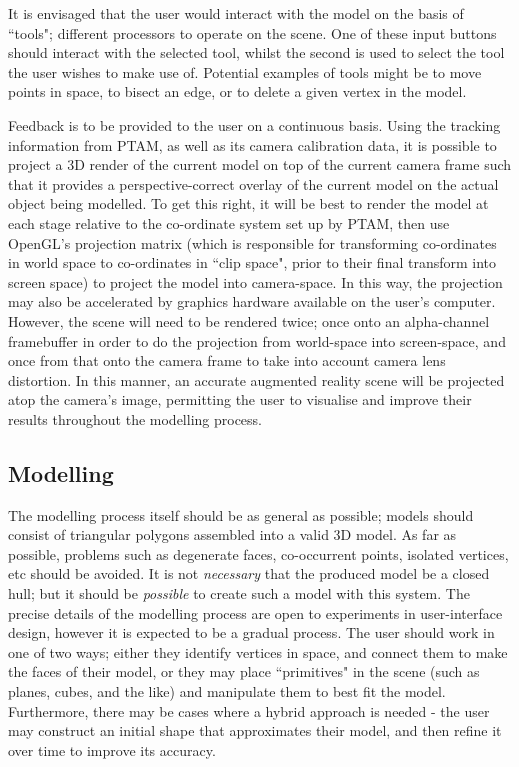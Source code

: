 \documentclass[a4paper,10pt]{article}
\begin{document}
It is envisaged that the user would interact with the model on the basis of ``tools"; different processors to operate on the scene. One of these input buttons should interact with the selected tool, whilst the second is used to select the tool the user wishes to make use of. Potential examples of tools might be to move points in space, to bisect an edge, or to delete a given vertex in the model.

Feedback is to be provided to the user on a continuous basis. Using the tracking information from PTAM, as well as its camera calibration data, it is possible to project a 3D render of the current model on top of the current camera frame such that it provides a perspective-correct overlay of the current model on the actual object being modelled. To get this right, it will be best to render the model at each stage relative to the co-ordinate system set up by PTAM, then use OpenGL's projection matrix (which is responsible for transforming  co-ordinates in world space to co-ordinates in ``clip space", prior to their final transform into screen space) to project the model into camera-space. In this way, the projection may also be accelerated by graphics hardware available on the user's computer. However, the scene will need to be rendered twice; once onto an alpha-channel framebuffer in order to do the projection from world-space into screen-space, and once from that onto the camera frame to take into account camera lens distortion. In this manner, an accurate augmented reality scene will be projected atop the camera's image, permitting the user to visualise and improve their results throughout the modelling process.

\subsection{Modelling}
\label{approachmodel}
The modelling process itself should be as general as possible; models should consist of triangular polygons assembled into a valid 3D model. As far as possible, problems such as degenerate faces, co-occurrent points, isolated vertices, etc should be avoided. It is not \textit{necessary} that the produced model be a closed hull; but it should be \textit{possible} to create such a model with this system. The precise details of the modelling process are open to experiments in user-interface design, however it is expected to be a gradual process. The user should work in one of two ways; either they identify vertices in space, and connect them to make the faces of their model, or they may place ``primitives" in the scene (such as planes, cubes, and the like) and manipulate them to best fit the model. Furthermore, there may be cases where a hybrid approach is needed - the user may construct an initial shape that approximates their model, and then refine it over time to improve its accuracy.
\end{document}
